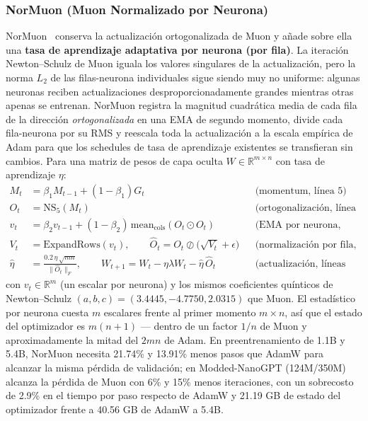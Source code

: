 \subsubsection{NorMuon (Muon Normalizado por Neurona)}
NorMuon~\citep{li_normuon_2025} conserva la actualización ortogonalizada de Muon y añade
sobre ella una \textbf{tasa de aprendizaje adaptativa por neurona (por fila)}. La
iteración Newton--Schulz de Muon iguala los valores singulares de la actualización, pero
la norma $L_2$ de las filas-neurona individuales sigue siendo muy no uniforme: algunas
neuronas reciben actualizaciones desproporcionadamente grandes mientras otras apenas se
entrenan. NorMuon registra la magnitud cuadrática media de cada fila de la dirección
\emph{ortogonalizada} en una EMA de segundo momento, divide cada fila-neurona por su RMS
y reescala toda la actualización a la escala empírica de Adam para que los schedules de
tasa de aprendizaje existentes se transfieran sin cambios. Para una matriz de pesos de
capa oculta $W \in \mathbb{R}^{m \times n}$ con tasa de aprendizaje $\eta$:
\begin{align}
M_t &= \beta_1 M_{t-1} + (1-\beta_1) G_t && \text{(momentum, línea 5)} \\
O_t &= \mathrm{NS}_5(M_t) && \text{(ortogonalización, línea 6)} \\
v_t &= \beta_2 v_{t-1} + (1-\beta_2)\,\mathrm{mean}_{\mathrm{cols}}(O_t \odot O_t) && \text{(EMA por neurona, línea 7)} \\
V_t &= \mathrm{ExpandRows}(v_t), \qquad \widehat{O}_t = O_t \oslash \big(\sqrt{V_t} + \epsilon\big) && \text{(normalización por fila, líneas 8--9)} \\
\hat\eta &= \frac{0.2\,\eta\,\sqrt{mn}}{\lVert \widehat{O}_t \rVert_F}, \qquad
W_{t+1} = W_t - \eta\lambda W_t - \hat\eta\,\widehat{O}_t && \text{(actualización, líneas 10--11)}
\end{align}
con $v_t \in \mathbb{R}^m$ (un escalar por neurona) y los mismos coeficientes quínticos
de Newton--Schulz $(a,b,c)=(3.4445,-4.7750,2.0315)$ que Muon. El estadístico por neurona
cuesta $m$ escalares frente al primer momento $m \times n$, así que el estado del
optimizador es $m(n+1)$ --- dentro de un factor $1/n$ de Muon y aproximadamente la mitad
del $2mn$ de Adam. En preentrenamiento de 1.1B y 5.4B, NorMuon necesita 21.74\% y 13.91\%
menos pasos que AdamW para alcanzar la misma pérdida de validación; en Modded-NanoGPT
(124M/350M) alcanza la pérdida de Muon con 6\% y 15\% menos iteraciones, con un sobrecosto
de 2.9\% en el tiempo por paso respecto de AdamW y 21.19 GB de estado del optimizador
frente a 40.56 GB de AdamW a 5.4B.

